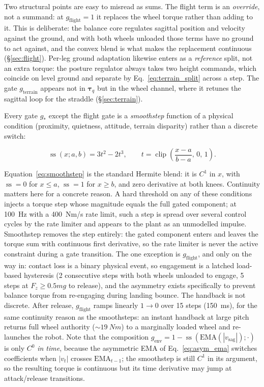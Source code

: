 \documentclass[conference]{IEEEtran}
\begin{document}
Two structural points are easy to misread as sums.
The flight term is an \emph{override}, not a summand: at $g_{\text{flight}}{=}1$ it replaces the wheel torque rather than adding to it. This is deliberate: the balance core regulates sagittal position and velocity against the ground, and with both wheels unloaded those terms have no ground to act against, and the convex blend is what makes the replacement continuous (\S\ref{sec:flight}).
Per-leg ground adaptation likewise enters as a \emph{reference} split, not an extra torque: the posture regulator always takes two height commands, which coincide on level ground and separate by Eq.~\eqref{eq:terrain_split} across a step. The gate $g_{\text{terrain}}$ appears not in $\boldsymbol{\tau}_q$ but in the wheel channel, where it retunes the sagittal loop for the straddle (\S\ref{sec:terrain}).

Every gate $g_*$ except the flight gate is a \emph{smoothstep} function of a physical condition (proximity, quietness, attitude, terrain disparity) rather than a discrete switch:

\begin{equation}
\operatorname{ss}(x;a,b) = 3t^2 - 2t^3,
\qquad t = \operatorname{clip}\!\left(\frac{x-a}{b-a},\,0,\,1\right).
\label{eq:smoothstep}
\end{equation}

Equation~\eqref{eq:smoothstep} is the standard Hermite blend: it is $C^1$ in $x$, with $\operatorname{ss}=0$ for $x\leq a$, $\operatorname{ss}=1$ for $x\geq b$, and zero derivative at both knees.
Continuity matters here for a concrete reason. A hard threshold on any of these conditions injects a torque step whose magnitude equals the full gated component; at \SI{100}{Hz} with a \SI{400}{Nm/s} rate limit, such a step is spread over several control cycles by the rate limiter and appears to the plant as an unmodelled impulse.
Smoothstep removes the step entirely: the gated component enters and leaves the torque sum with continuous first derivative, so the rate limiter is never the active constraint during a gate transition.
The one exception is $g_{\text{flight}}$, and only on the way in: contact loss is a binary physical event, so engagement is a latched load-based hysteresis (\num{2} consecutive steps with both wheels unloaded to engage, \num{5} steps at $F_z \geq 0.5mg$ to release), and the asymmetry exists specifically to prevent balance torque from re-engaging during landing bounce.
The handback is not discrete. After release, $g_{\text{flight}}$ ramps linearly $1\to0$ over \num{15} steps (\SI{150}{ms}), for the same continuity reason as the smoothsteps: an instant handback at large pitch returns full wheel authority (${\sim}\SI{19}{Nm}$) to a marginally loaded wheel and re-launches the robot.
Note that the composition $g_{\text{env}} = 1 - \operatorname{ss}(\mathrm{EMA}(|v_{\text{sag}}|);\cdot)$ is only $C^0$ \emph{in time}, because the asymmetric EMA of Eq.~\eqref{eq:asym_ema} switches coefficients when $|v_t|$ crosses $\mathrm{EMA}_{t-1}$; the smoothstep is still $C^1$ in its argument, so the resulting torque is continuous but its time derivative may jump at attack/release transitions.
\end{document}
